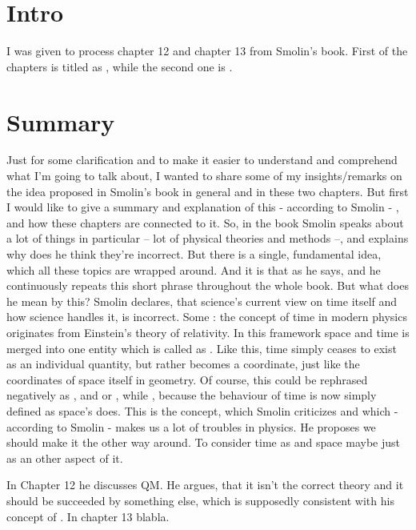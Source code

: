 \section{Intro}
I was given to process chapter 12 and chapter 13 from Smolin's book. First of the chapters is titled as , while the second one is .

\section{Summary}
Just for some clarification and to make it easier to understand and comprehend what I'm going to talk about, I wanted to share some of my insights/remarks on the idea proposed in Smolin's book in general and in these two chapters. But first I would like to give a summary and explanation of this - according to Smolin - , and how these chapters are connected to it. \newline
So, in the book Smolin speaks about a lot of things in particular -- lot of physical theories and methods --, and explains why does he think they're incorrect. But there is a single, fundamental idea, which all these topics are wrapped around. And it is that  as he says, and he continuously repeats this short phrase throughout the whole book. But what does he mean by this? \newline
Smolin declares, that science's current view on time itself and how science handles it, is incorrect. Some : the concept of time in modern physics originates from Einstein's theory of relativity. In this framework space and time is merged into one entity which is called as . Like this, time simply ceases to exist as an individual quantity, but rather becomes a coordinate, just like the coordinates of space itself in geometry. Of course, this could be rephrased negatively as , and  or , while , because the behaviour of time is now simply defined as space's does. This is the concept, which Smolin criticizes and which - according to Smolin - makes us a lot of troubles in physics. He proposes we should make it the other way around. To consider time as  and space maybe just as an other aspect of it. \par
In Chapter 12 he discusses QM. He argues, that it isn't the correct theory and it should be succeeded by something else, which is supposedly consistent with his concept of . In chapter 13 blabla.

